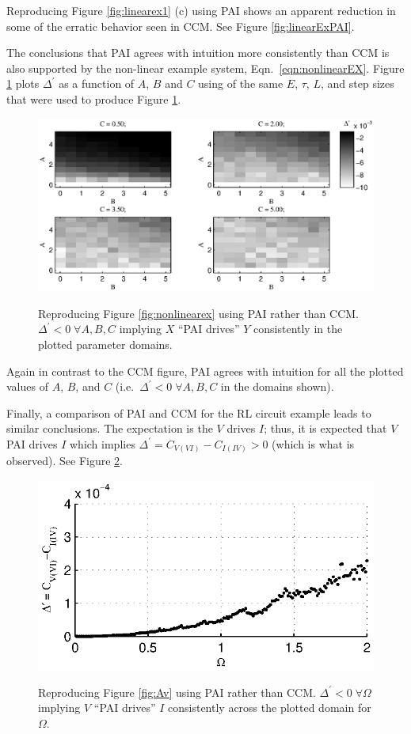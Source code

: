 \documentclass[twocolumn,aps,pre,groupedaddress]{revtex4-1}
\begin{document}
Reproducing Figure \ref{fig:linearex1} (c) using PAI shows an apparent reduction in some of the erratic behavior seen in CCM.  See Figure \ref{fig:linearExPAI}.

The conclusions that PAI agrees with intuition more consistently than CCM is also supported by the non-linear example system, Eqn.\ \ref{eqn:nonlinearEX}.  Figure \ref{fig:nonlinearEXPAI} plots $\Delta^\prime$ as a function of $A$, $B$ and $C$ using of the same $E$, $\tau$, $L$, and step sizes that were used to produce Figure \ref{fig:nonlinearEXPAI}.
\begin{figure}[ht]
\includegraphics[scale=0.5]{NonLinearPAIEx.eps} \\
\caption{Reproducing Figure \ref{fig:nonlinearex} using PAI rather than CCM.  $\Delta^\prime<0\;\forall A,B,C$ implying $X$ ``PAI drives'' $Y$ consistently in the plotted parameter domains.}
\label{fig:nonlinearEXPAI}
\end{figure}
Again in contrast to the CCM figure, PAI agrees with intuition for all the plotted values of $A$, $B$, and $C$ (i.e.\ $\Delta^\prime<0\;\forall A,B,C$ in the domains shown).

Finally, a comparison of PAI and CCM for the RL circuit example leads to similar conclusions.  The expectation is the $V$ drives $I$; thus, it is expected that $V$ PAI drives $I$ which implies $\Delta^\prime = C_{V(VI)} - C_{I(IV)} > 0$ (which is what is observed).  See Figure \ref{fig:AvPAI}.
\begin{figure}[ht]
\includegraphics[scale=0.8]{RLCircuitVaryV_FreqPAI.eps} \\
\caption{Reproducing Figure \ref{fig:Av} using PAI rather than CCM.  $\Delta^\prime<0\;\forall \Omega$ implying $V$ ``PAI drives'' $I$ consistently across the plotted domain for $\Omega$.}
\label{fig:AvPAI}
\end{figure}
\end{document}
